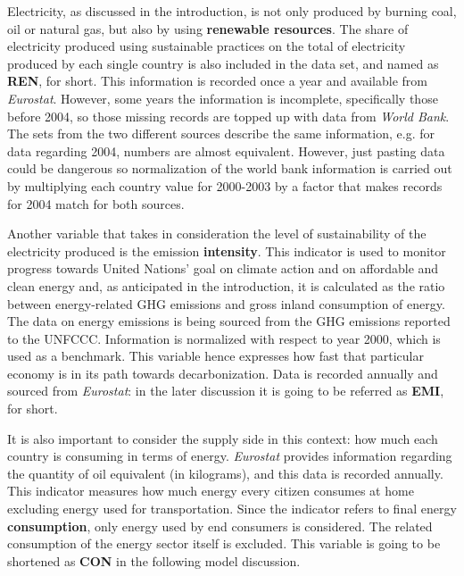 \documentclass[a4paper,12pt]{book}
\begin{document}
Electricity, as discussed in the introduction, is not only produced by burning coal, oil or natural gas, but also by using \textbf{renewable resources}. The share of electricity produced using sustainable practices on the total of electricity produced by each single country is also included in the data set, and named as \textbf{REN}, for short. This information is recorded once a year and available from \textit{Eurostat}. However, some years the information is incomplete, specifically those before 2004, so those missing records are topped up with data from \textit{World Bank}. The sets from the two different sources describe the same information, e.g. for data regarding 2004, numbers are almost equivalent. However, just pasting data could be dangerous so normalization of the world bank information is carried out by multiplying each country value for 2000-2003 by a factor that makes records for 2004 match for both sources.

Another variable that takes in consideration the level of sustainability of the electricity produced is the emission \textbf{intensity}. This indicator is used to monitor progress towards United Nations' goal on climate action and on affordable and clean energy and, as anticipated in the introduction, it is calculated as the ratio between energy-related GHG emissions and gross inland consumption of energy. The data on energy emissions is being sourced from the GHG emissions reported to the UNFCCC. Information is normalized with respect to year 2000, which is used as a benchmark. This variable hence expresses how fast that particular economy is in its path towards decarbonization. Data is recorded annually and sourced from \textit{Eurostat}: in the later discussion it is going to be referred as \textbf{EMI}, for short.

It is also important to consider the supply side in this context: how much each country is consuming in terms of energy. \textit{Eurostat} provides information regarding the quantity of oil equivalent (in kilograms), and this data is recorded annually. This indicator measures how much energy every citizen consumes at home excluding energy used for transportation. Since the indicator refers to final energy \textbf{consumption}, only energy used by end consumers is considered. The related consumption of the energy sector itself is excluded. This variable is going to be shortened as \textbf{CON} in the following model discussion.
\end{document}
